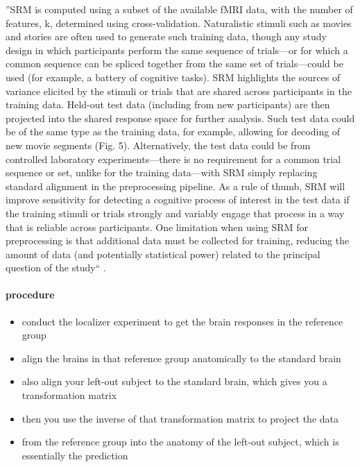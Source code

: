 %
''SRM is computed using a subset of the available fMRI data, with the number of
features, k, determined using cross-validation.
%
Naturalistic stimuli such as movies and stories are often used to generate such
training data, though any study design in which participants perform the same
sequence of trials—or for which a common sequence can be spliced together from
the same set of trials—could be used (for example, a battery of cognitive
tasks).
%
SRM highlights the sources of variance elicited by the stimuli or trials that
are shared across participants in the training data.
%
Held-out test data (including from new participants) are then projected into the
shared response space for further analysis.
%
Such test data could be of the same type as the training data, for example,
allowing for decoding of new movie segments (Fig.  5).
%
Alternatively, the test data could be from controlled laboratory
experiments—there is no requirement for a common trial sequence or set, unlike
for the training data—with SRM simply replacing standard alignment in the
preprocessing pipeline.
%
As a rule of thumb, SRM will improve sensitivity for detecting a cognitive
process of interest in the test data if the training stimuli or trials strongly
and variably engage that process in a way that is reliable across participants.
%
One limitation when using SRM for preprocessing is that additional data must be
collected for training, reducing the amount of data (and potentially statistical
power) related to the principal question of the study``
\citep{cohen2017computational}.

\paragraph{procedure}
%
\begin{itemize}
    \item conduct the localizer experiment to get the brain responses in the
    reference group
    \item align the brains in that reference group anatomically to the standard
    brain
    \item also align your left-out subject to the standard brain, which gives
    you a transformation matrix
    \item then you use the inverse of that transformation matrix to project the
    data
    \item from the reference group into the anatomy of the left-out subject,
    which is essentially the prediction
\end{itemize}


